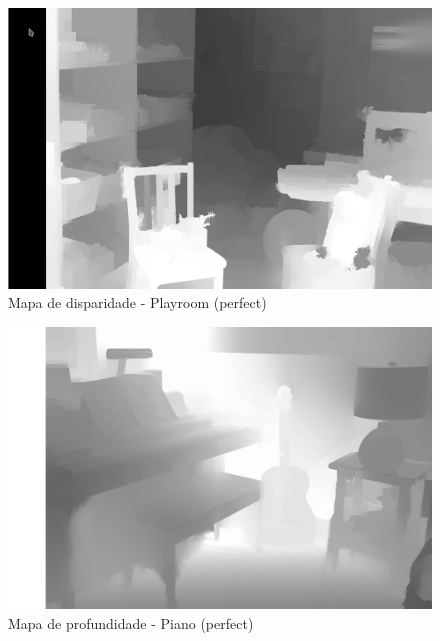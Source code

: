 \documentclass{bmvc2k}
\begin{document}
\begin{figure}[htbp]
            \centering
            \includegraphics[scale=0.3]{Figs/dispplay.png}
            \caption{Mapa de disparidade - Playroom (perfect)}
            \label{1}
        \end{figure}
        
\begin{figure}[htbp]
            \centering
            \includegraphics[scale=0.25]{Figs/profundidade.png}
            \caption{Mapa de profundidade - Piano (perfect)}
            \label{1}
        \end{figure}
        
\end{document}
